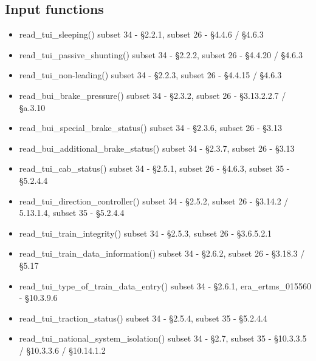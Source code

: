 \documentclass{template/openetcs_article}
\begin{document}
	\subsection{Input functions}
		\begin{itemize}
			\item read\_tui\_sleeping()
				\subitem subset 34 - §2.2.1, subset 26 - §4.4.6 / §4.6.3
			\item read\_tui\_passive\_shunting()
				\subitem subset 34 - §2.2.2, subset 26 - §4.4.20 / §4.6.3
			\item read\_tui\_non-leading()
				\subitem subset 34 - §2.2.3, subset 26 - §4.4.15 / §4.6.3
			\item read\_bui\_brake\_pressure()
				\subitem subset 34 - §2.3.2, subset 26 - §3.13.2.2.7 / §a.3.10
			\item read\_bui\_special\_brake\_status()
				\subitem subset 34 - §2.3.6, subset 26 - §3.13
			\item read\_bui\_additional\_brake\_status()
				\subitem subset 34 - §2.3.7, subset 26 - §3.13
			\item read\_tui\_cab\_status()
				\subitem subset 34 - §2.5.1, subset 26 - §4.6.3, subset 35 - §5.2.4.4
			\item read\_tui\_direction\_controller()
				\subitem subset 34 - §2.5.2, subset 26 - §3.14.2 / 5.13.1.4, subset 35 - §5.2.4.4
			\item read\_tui\_train\_integrity()
				\subitem subset 34 - §2.5.3, subset 26 - §3.6.5.2.1
			\item read\_tui\_train\_data\_information()
				\subitem subset 34 - §2.6.2, subset 26 - §3.18.3 / §5.17
			\item read\_tui\_type\_of\_train\_data\_entry()
				\subitem subset 34 - §2.6.1, era\_ertms\_015560 - §10.3.9.6
			\item read\_tui\_traction\_status()
				\subitem subset 34 - §2.5.4, subset 35 - §5.2.4.4
			\item read\_tui\_national\_system\_isolation()
				\subitem subset 34 - §2.7, subset 35 - §10.3.3.5 / §10.3.3.6 / §10.14.1.2
		\end{itemize}
\end{document}

